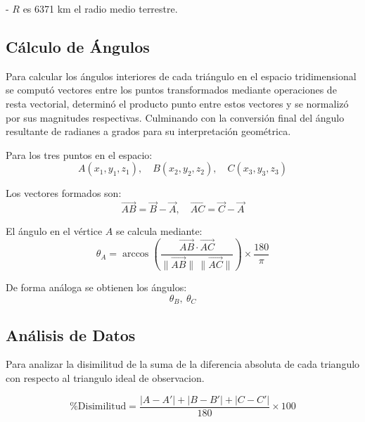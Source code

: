 \documentclass[a4paper,alpha-refs]{eSpectra}
\begin{document}
- \(R\) es 6371 km el radio medio terrestre.



\subsection{Cálculo de Ángulos}
Para calcular los ángulos interiores de cada triángulo en el espacio tridimensional se computó vectores entre los puntos transformados mediante operaciones de resta vectorial, determinó el producto punto entre estos vectores y se normalizó por sus magnitudes respectivas.  Culminando con la conversión final del ángulo resultante de radianes a grados para su interpretación geométrica.

\smallskip

Para los tres puntos en el espacio:
\[
A(x_1, y_1, z_1), \quad B(x_2, y_2, z_2), \quad C(x_3, y_3, z_3)
\]

Los vectores formados son:
\[
\vec{AB} = \vec{B} - \vec{A}, \quad
\vec{AC} = \vec{C} - \vec{A}
\]

El ángulo en el vértice \(A\) se calcula mediante:
\[
\theta_A = \arccos \left(
\frac{ \vec{AB} \cdot \vec{AC} }{ \lVert \vec{AB} \rVert \, \lVert \vec{AC} \rVert }
\right) \times \frac{180}{\pi}
\]

De forma análoga se obtienen los ángulos:
\[
\theta_B, \ \theta_C
\]

\vspace{-\baselineskip}  %
\vspace{-0.5\baselineskip}  %

\subsection{Análisis de Datos }

Para analizar la disimilitud de la suma de la diferencia absoluta de cada triangulo con respecto al triangulo ideal de observacion. 


\begin{equation}
\% \text{Disimilitud} = 
\frac{ \left| A - A' \right| + \left| B - B' \right| + \left| C - C' \right| }{180} \times 100
\end{equation}
\end{document}
